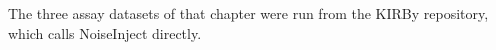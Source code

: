 

The three assay datasets of that chapter were run from the KIRBy repository, which calls NoiseInject directly.
